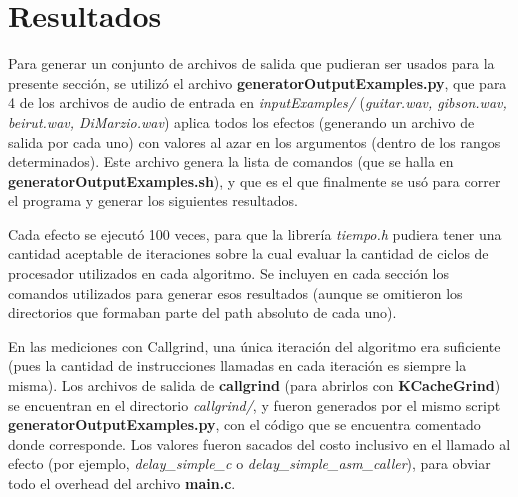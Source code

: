 \section{Resultados}
\label{sec:resultados}

Para generar un conjunto de archivos de salida que pudieran ser usados para la presente sección, se utilizó el archivo \textbf{generatorOutputExamples.py}, que para 4 de los archivos de audio de entrada en \textit{inputExamples/} (\textit{guitar.wav, gibson.wav, beirut.wav, DiMarzio.wav}) aplica todos los efectos (generando un archivo de salida por cada uno) con valores al azar en los argumentos (dentro de los rangos determinados). Este archivo genera la lista de comandos (que se halla en \textbf{generatorOutputExamples.sh}), y que es el que finalmente se usó para correr el programa y generar los siguientes resultados.
 
Cada efecto se ejecutó 100 veces, para que la librería \textit{tiempo.h} pudiera tener una cantidad aceptable de iteraciones sobre la cual evaluar la cantidad de ciclos de procesador utilizados en cada algoritmo. Se incluyen en cada sección los comandos utilizados para generar esos resultados (aunque se omitieron los directorios que formaban parte del path absoluto de cada uno).

En las mediciones con Callgrind, una única iteración del algoritmo era suficiente (pues la cantidad de instrucciones llamadas en cada iteración es siempre la misma). Los archivos de salida de \textbf{callgrind} (para abrirlos con \textbf{KCacheGrind}) se encuentran en el directorio \textit{callgrind/}, y fueron generados por el mismo script \textbf{generatorOutputExamples.py}, con el código que se encuentra comentado donde corresponde. Los valores fueron sacados del costo inclusivo en el llamado al efecto (por ejemplo, \textit{delay\_simple\_c} o \textit{delay\_simple\_asm\_caller}), para obviar todo el overhead del archivo \textbf{main.c}.



%
\newpage

\newpage

\newpage

\newpage

\newpage
